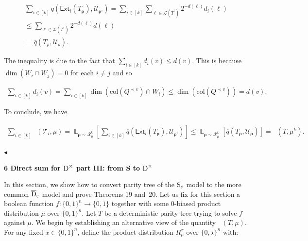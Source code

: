 \[\begin{gathered}
\displaystyle\sum\nolimits_{i\in[k]}\overline{q}\left(\mathsf{Ext}_{i}\mathopen{}\left(T_{\bm{\rho}}\mathclose{}\right),\mathcal{U}_{\bm{\rho}^{i}}\right) \displaystyle=\sum_{i\in[k]}\sum_{\ell\in\mathcal{L}(T^{\prime})}2^{-d(\ell)}d_{i}(\ell) \\
\displaystyle\leq\sum_{\ell\in\mathcal{L}(T^{\prime})}2^{-d(\ell)}d(\ell) \\
\displaystyle=\overline{q}(T_{\rho},\mathcal{U}_{\rho}).
\end{gathered}\]


The inequality is due to the fact that $\sum_{i\in[k]}d_{i}(v)\leq d(v)$. This is because $\dim(W_{i}\cap W_{j})=0$ for each $i\neq j$ and so\par


\[\begin{gathered}
\sum\nolimits_{i\in[k]}d_{i}(v)=\sum\nolimits_{i\in[k]}\dim(\mathrm{col}(Q^{\prec v})\cap W_{i})\leq\dim(\mathrm{col}(Q^{\prec v}))=d(v).
\end{gathered}\]


To conclude, we have\par


\[\begin{gathered}
\sum\nolimits_{i\in[k]}\mathop{\overline{sq}}(\mathcal{T}_{i},\mu)=\mathop{\mathbb{E}}_{\bm{\rho}\sim\mathcal{R}_{\mu}^{k}}\left[\sum\nolimits_{i\in[k]}\overline{q}\left(\mathsf{Ext}_{i}\mathopen{}\left(T_{\bm{\rho}}\mathclose{}\right),\mathcal{U}_{\bm{\rho}^{i}}\right)\right]\leq\mathop{\mathbb{E}}_{\bm{\rho}\sim\mathcal{R}_{\mu}^{k}}\left[\overline{q}(T_{\bm{\rho}},\mathcal{U}_{\bm{\rho}})\right]=\mathop{\overline{sq}}(T,\mu^{k}).\
\end{gathered}\]


$\blacktriangleleft$\par







\par\medskip\noindent\textbf{
6 Direct sum for ${\textup{D}}^{\times}$ part III: from S to ${\textup{D}}^{\times}$
}\par




In this section, we show how to convert parity tree of the ${\textup{S}}_{\varepsilon}$ model to the more common $\overline{{\textup{D}}}_{\varepsilon}$ model and prove Theorems 19 and 20. Let us fix for this section a boolean function $f\colon\{0,1\}^{n}\to\{0,1\}$ together with some $0$-biased product distribution $\mu$ over $\{0,1\}^{n}$. Let $T$ be a deterministic parity tree trying to solve $f$ against $\mu$. We begin by establishing an alternative view of the quantity $\mathop{\overline{sq}}(T,\mu)$. For any fixed $x\in\{0,1\}^{n}$, define the product distribution $R_{\mu}^{x}$ over $\{0,\star\}^{n}$ with:\par


